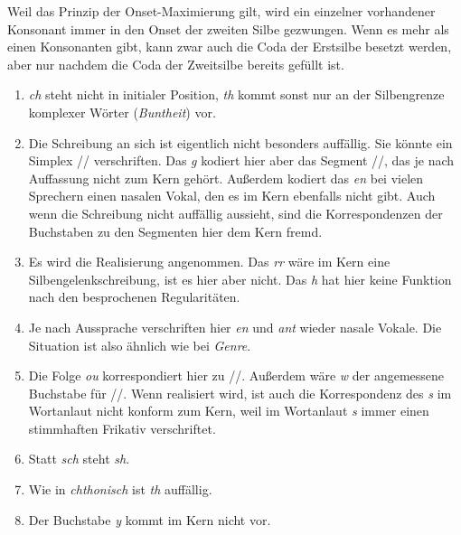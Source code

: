 \label{sol:phonologischeschreibprinzipien05} Weil das Prinzip der Onset-Maximierung gilt, wird ein einzelner vorhandener Konsonant immer in den Onset der zweiten Silbe gezwungen.
Wenn es mehr als einen Konsonanten gibt, kann zwar auch die Coda der Erstsilbe besetzt werden, aber nur nachdem die Coda der Zweitsilbe bereits gefüllt ist.

\label{sol:phonologischeschreibprinzipien06}

\begin{enumerate}
  \item \textit{ch} steht nicht in initialer Position, \textit{th} kommt sonst nur an der Silbengrenze komplexer Wörter (\textit{Buntheit}) vor.
  \item Die Schreibung an sich ist eigentlich nicht besonders auffällig.
    Sie könnte ein Simplex // verschriften.
    Das \textit{g} kodiert hier aber das Segment //, das je nach Auffassung nicht zum Kern gehört.
    Außerdem kodiert das \textit{en} bei vielen Sprechern einen nasalen Vokal, den es im Kern ebenfalls nicht gibt.
    Auch wenn die Schreibung nicht auffällig aussieht, sind die Korrespondenzen der Buchstaben zu den Segmenten hier dem Kern fremd.
  \item Es wird die Realisierung \textipa{[gonoK\o:]} angenommen.
    Das \textit{rr} wäre im Kern eine Silbengelenkschreibung, ist es hier aber nicht.
    Das \textit{h} hat hier keine Funktion nach den besprochenen Regularitäten.
  \item Je nach Aussprache verschriften hier \textit{en} und \textit{ant} wieder nasale Vokale.
    Die Situation ist also ähnlich wie bei \textit{Genre}.
  \item Die Folge \textit{ou} korrespondiert hier zu //.
    Außerdem wäre \textit{w} der angemessene Buchstabe für //.
    Wenn \textipa{[su:v@n\t{i5}]} realisiert wird, ist auch die Korrespondenz des \textit{s} im Wortanlaut nicht konform zum Kern, weil im Wortanlaut \textit{s} immer einen stimmhaften Frikativ verschriftet.
  \item Statt \textit{sch} steht \textit{sh}.
  \item Wie in \textit{chthonisch} ist \textit{th} auffällig.
  \item Der Buchstabe \textit{y} kommt im Kern nicht vor.
\end{enumerate}


